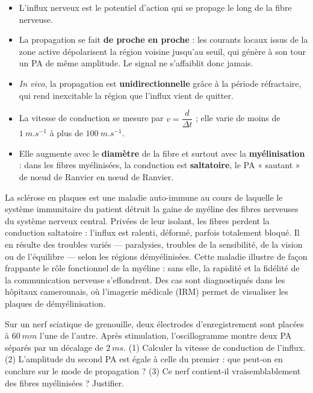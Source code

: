 \documentclass[11pt]{article}
\newcommand{\cle}[1]{{\popxbold\color{popdark}#1}}
\begin{document}
\begin{aretenir}
\begin{itemize}
\item L'\cle{influx nerveux} est le potentiel d'action qui se propage le long de la fibre nerveuse.
\item La propagation se fait \textbf{de proche en proche} : les courants locaux issus de la zone active dépolarisent la région voisine jusqu'au seuil, qui génère à son tour un PA de même amplitude. Le signal ne s'affaiblit donc jamais.
\item \emph{In vivo}, la propagation est \textbf{unidirectionnelle} grâce à la période réfractaire, qui rend inexcitable la région que l'influx vient de quitter.
\item La vitesse de conduction se mesure par $v = \dfrac{d}{\Delta t}$ ; elle varie de moins de $\SI{1}{m.s^{-1}}$ à plus de $\SI{100}{m.s^{-1}}$.
\item Elle augmente avec le \textbf{diamètre} de la fibre et surtout avec la \textbf{myélinisation} : dans les fibres myélinisées, la conduction est \textbf{saltatoire}, le PA « sautant » de nœud de Ranvier en nœud de Ranvier.
\end{itemize}
\end{aretenir}

\begin{savaistu}
La \cle{sclérose en plaques} est une maladie auto-immune au cours de laquelle le système immunitaire du patient détruit la gaine de myéline des fibres nerveuses du système nerveux central. Privées de leur isolant, les fibres perdent la conduction saltatoire : l'influx est ralenti, déformé, parfois totalement bloqué. Il en résulte des troubles variés — paralysies, troubles de la sensibilité, de la vision ou de l'équilibre — selon les régions démyélinisées. Cette maladie illustre de façon frappante le rôle fonctionnel de la myéline : sans elle, la rapidité et la fidélité de la communication nerveuse s'effondrent. Des cas sont diagnostiqués dans les hôpitaux camerounais, où l'imagerie médicale (IRM) permet de visualiser les plaques de démyélinisation.
\end{savaistu}

\begin{exercice}
Sur un nerf sciatique de grenouille, deux électrodes d'enregistrement sont placées à $\SI{60}{mm}$ l'une de l'autre. Après stimulation, l'oscillogramme montre deux PA séparés par un décalage de $\SI{2}{ms}$. (1) Calculer la vitesse de conduction de l'influx. (2) L'amplitude du second PA est égale à celle du premier : que peut-on en conclure sur le mode de propagation ? (3) Ce nerf contient-il vraisemblablement des fibres myélinisées ? Justifier.
\end{exercice}
\end{document}
